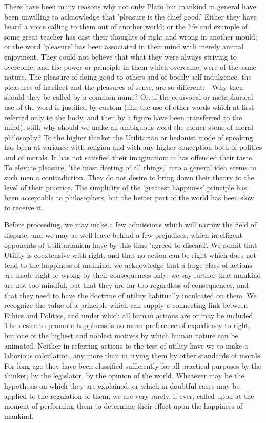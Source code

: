 \documentclass[11pt,letter]{article}
\begin{document}
\par  There have been many reasons why not only Plato but mankind in general have been unwilling to acknowledge that 'pleasure is the chief good.' Either they have heard a voice calling to them out of another world; or the life and example of some great teacher has cast their thoughts of right and wrong in another mould; or the word 'pleasure' has been associated in their mind with merely animal enjoyment. They could not believe that what they were always striving to overcome, and the power or principle in them which overcame, were of the same nature. The pleasure of doing good to others and of bodily self-indulgence, the pleasures of intellect and the pleasures of sense, are so different:—Why then should they be called by a common name? Or, if the equivocal or metaphorical use of the word is justified by custom (like the use of other words which at first referred only to the body, and then by a figure have been transferred to the mind), still, why should we make an ambiguous word the corner-stone of moral philosophy? To the higher thinker the Utilitarian or hedonist mode of speaking has been at variance with religion and with any higher conception both of politics and of morals. It has not satisfied their imagination; it has offended their taste. To elevate pleasure, 'the most fleeting of all things,' into a general idea seems to such men a contradiction. They do not desire to bring down their theory to the level of their practice. The simplicity of the 'greatest happiness' principle has been acceptable to philosophers, but the better part of the world has been slow to receive it.

\par  Before proceeding, we may make a few admissions which will narrow the field of dispute; and we may as well leave behind a few prejudices, which intelligent opponents of Utilitarianism have by this time 'agreed to discard'. We admit that Utility is coextensive with right, and that no action can be right which does not tend to the happiness of mankind; we acknowledge that a large class of actions are made right or wrong by their consequences only; we say further that mankind are not too mindful, but that they are far too regardless of consequences, and that they need to have the doctrine of utility habitually inculcated on them. We recognize the value of a principle which can supply a connecting link between Ethics and Politics, and under which all human actions are or may be included. The desire to promote happiness is no mean preference of expediency to right, but one of the highest and noblest motives by which human nature can be animated. Neither in referring actions to the test of utility have we to make a laborious calculation, any more than in trying them by other standards of morals. For long ago they have been classified sufficiently for all practical purposes by the thinker, by the legislator, by the opinion of the world. Whatever may be the hypothesis on which they are explained, or which in doubtful cases may be applied to the regulation of them, we are very rarely, if ever, called upon at the moment of performing them to determine their effect upon the happiness of mankind.
\end{document}
